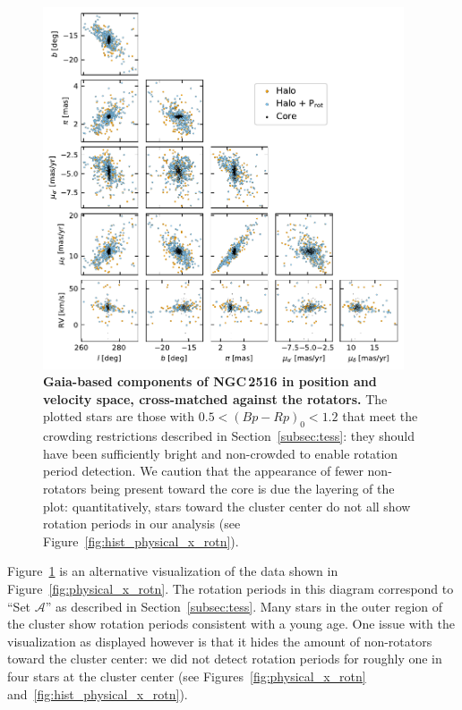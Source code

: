 \documentclass[12pt,twocolumn,tighten]{aastex63}
\begin{document}
\begin{figure}[t]
	\begin{center}
		\leavevmode
		\includegraphics[width=0.95\textwidth]{f4.pdf}
	\end{center}
	\vspace{-0.7cm}
  \caption{ {\bf Gaia-based components of NGC\,2516 in position and
  velocity space, cross-matched against the rotators.} The plotted
  stars are those with $0.5<(Bp-Rp)_0<1.2$ that meet the crowding
  restrictions described in Section~\ref{subsec:tess}: they should
  have been sufficiently bright and non-crowded to enable rotation
  period detection.  We caution that the appearance of fewer
  non-rotators being present toward the core is due the layering of
  the plot: quantitatively, stars toward the cluster center do not all
  show rotation periods in our analysis (see
  Figure~\ref{fig:hist_physical_x_rotn}).
  \label{fig:gaia6d_x_rotn}
	}
\end{figure}

Figure~\ref{fig:gaia6d_x_rotn} is an alternative visualization of the
data shown in Figure~\ref{fig:physical_x_rotn}.  The rotation periods
in this diagram correspond to ``Set $\mathcal{A}$'' as described in
Section~\ref{subsec:tess}.  Many stars in the outer region of the
cluster show rotation periods consistent with a young age.  One issue
with the visualization as displayed however is that it hides the
amount of non-rotators toward the cluster center: we did not detect
rotation periods for roughly one in four stars at the cluster
center (see Figures~\ref{fig:physical_x_rotn}
and~\ref{fig:hist_physical_x_rotn}).
\end{document}
